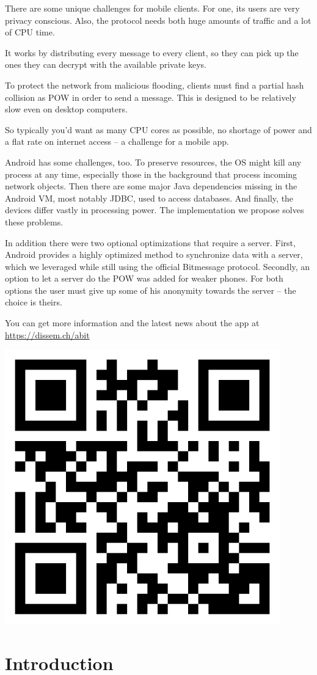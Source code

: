 \documentclass{bfh}
\begin{document}
  There are some unique challenges for mobile clients. For one, its users are very privacy conscious. Also, the protocol needs both huge amounts of traffic and a lot of \acs{CPU} time.

  It works by distributing every message to every client, so they can pick up the ones they can decrypt with the available private keys.

  To protect the network from malicious flooding, clients must find a partial hash collision as \acl{POW} in order to send a message. This is designed to be relatively slow even on desktop computers.

  So typically you'd want as many \acs{CPU} cores as possible, no shortage of power and a flat rate on internet access – a challenge for a mobile app.

  Android\texttrademark{} has some challenges, too. To preserve resources, the \acl{OS} might kill any process at any time, especially those in the background that process incoming network objects. Then there are some major Java dependencies missing in the Android \acs{VM}, most notably \acs{JDBC}, used to access databases. And finally, the devices differ vastly in processing power. The implementation we propose solves these problems.

  In addition there were two optional optimizations that require a server. First, Android provides a highly optimized method to synchronize data with a server, which we leveraged while still using the official Bitmessage protocol. Secondly, an option to let a server do the \acl{POW} was added for weaker phones. For both options the user must give up some of his anonymity towards the server -- the choice is theirs.

  You can get more information and the latest news about the app at \url{https://dissem.ch/abit}

  \begin{center}
    \includegraphics[width=0.2 \textwidth]{images/QR_abit_webpage.pdf}
  \end{center}


  \newpage
  \tableofcontents


  \newpage
  \section{Introduction}
\end{document}
